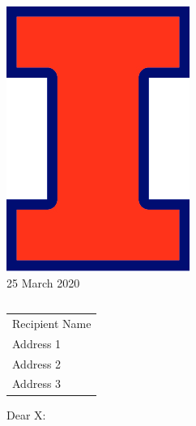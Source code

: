 \documentclass[10pt]{article}\usepackage[]{graphicx}\usepackage[]{color}
\begin{document}
\raggedright %
\includegraphics[scale=0.25]{BlockI-Logo-Full-Color-CMYK.jpg}\\ %

 \hfill\hfill\hfill %
 25 March 2020\\[10pt]  %
 
\begin{tabular}{l@{}}
\end{tabular}

\begin{tabular}{@{}l}
Recipient Name\\
Address 1\\
Address 2\\
Address 3
\end{tabular}


Dear X:

\lipsum[1-2]




\end{document}
